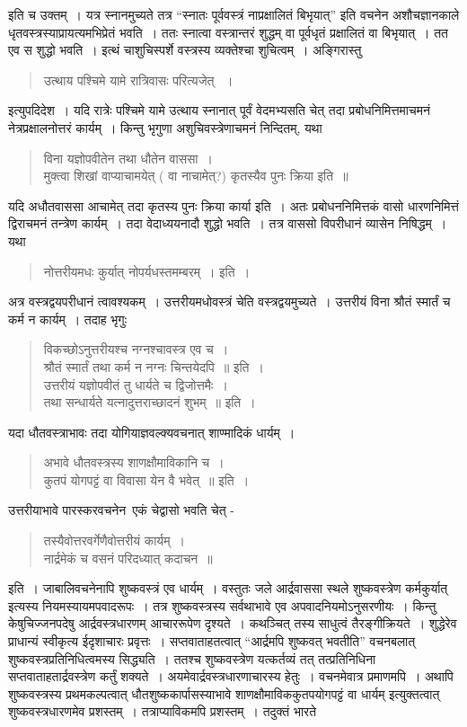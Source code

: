 {\begin{verse}
\end{verse}
इति च उक्तम्~। यत्र स्नानमुच्यते तत्र “स्नातः पूर्ववस्त्रं नाप्रक्षालितं बिभृयात्” इति वचनेन अशौचज्ञानकाले धृतवस्त्रस्याप्रायत्यमभिप्रेतं भवति~। ततः स्नात्वा वस्त्रान्तरं शुद्धम् वा पूर्वधृतं प्रक्षालितं वा बिभृयात्~। तत एव स शुद्धो भवति~। इत्थं चाशुचिस्पर्शे वस्त्रस्य व्यक्तेश्चा शुचित्वम्~। अङ्गिरास्तु  \enginline{-}
\begin{verse}
उत्थाय पश्चिमे यामे रात्रिवासः परित्यजेत् ~। 
\end{verse}
इत्युपदिदेश~। यदि रात्रेः पश्चिमे यामे उत्थाय स्नानात् पूर्वं वेदमभ्यसति चेत् तदा प्रबोधनिमित्तमाचमनं नेत्रप्रक्षालनोत्तरं कार्यम्~। किन्तु भृगुणा अशुचिवस्त्रेणाचमनं निन्दितम्, यथा \enginline{-}
\begin{verse}
विना यज्ञोपवीतेन तथा धौतेन वाससा~। \\
मुक्त्वा शिखां वाप्याचामयेत् ( वा नाचामेत्?) कृतस्यैव पुनः क्रिया इति~॥ 
\end{verse}
यदि अधौतवाससा आचामेत् तदा कृतस्य पुनः क्रिया कार्या इति~। अतः प्रबोधननिमित्तकं वासो धारणनिमित्तं द्विराचमनं तन्त्रेण कार्यम्~। तदा वेदाध्ययनादौ शुद्धो भवति~। तत्र वाससो विपरीधानं व्यासेन निषिद्धम्~। यथा \
\begin{verse}
नोत्तरीयमधः कुर्यात् नोपर्यधस्तमम्बरम्~। इति~। 
\end{verse}
अत्र वस्त्रद्वयपरीधानं त्वावश्यकम्~। उत्तरीयमधोवस्त्रं चेति वस्त्रद्वयमुच्यते~। उत्तरीयं विना श्रौतं स्मार्तं च कर्म न कार्यम्~। तदाह भृगुः \enginline{-} 
\begin{verse}
विकच्छोऽनुत्तरीयश्च नग्नश्चावस्त्र एव च~। \\
श्रौतं स्मार्तं तथा कर्म न नग्नः चिन्तयेदपि~॥ इति~। \\
उत्तरीयं यज्ञोपवीतं तु  धार्यते च द्विजोत्तमैः~। \\
तथा सन्धार्यते यत्नादुत्तराच्छादनं शुभम्~॥ इति~। 
\end{verse}
यदा धौतवस्त्राभावः तदा योगियाज्ञवल्क्यवचनात् शाण्मादिकं धार्यम्~। 
\begin{verse}
अभावे धौतवस्त्रस्य शाणक्षौमाविकानि च~। \\
कुतपं योगपट्टं वा विवासा येन वै भवेत्~॥ इति~। 
\end{verse}
उत्तरीयाभावे पारस्करवचनेन\ एकं चेद्वासो भवति चेत् -
\begin{verse}
तस्यैवोत्तरवर्गेणैवोत्तरीयं कार्यम्~। \\
नार्द्रमेकं च वसनं परिदध्यात् कदाचन~॥ 
\end{verse}
इति~। जाबालिवचनेनापि शुष्कवस्त्रं एव धार्यम्~। वस्तुतः जले आर्द्रवाससा स्थले शुष्कवस्त्रेण कर्मकुर्यात् इत्यस्य नियमस्यायमपवादरूपः~। तत्र शुष्कवस्त्रस्य सर्वथाभावे एव अपवादनियमोऽनुसरणीयः~। किन्तु केषुचिज्जनपदेषु आर्द्रवस्त्रधारणम् आचाररूपेण दृश्यते~। कथञ्चित् तस्य साधुत्वं तैरङ्गीक्रियते~। शुद्धेरेव प्राधान्यं स्वीकृत्य ईदृशाचारः प्रवृत्तः~। सप्तवाताहतत्वात् “आर्द्रमपि शुष्कवत् भवतीति” वचनबलात् शुष्कवस्त्रप्रतिनिधित्वमस्य सिद्ध्यति~। ततश्च शुष्कवस्त्रेण यत्कर्तव्यं तत् तत्प्रतिनिधिना सप्तवाताहतार्द्रवस्त्रेण कर्तुं शक्यते~। अयमेवार्द्रवस्त्रधारणाचारस्य हेतुः~। वचनमेवात्र प्रमाणमपि~। अथापि शुष्कवस्त्रस्य प्रथमकल्पत्वात् धौतशुष्ककार्पासस्याभावे शाणक्षौमाविककुतपयोगपट्टं वा धार्यम् इत्युक्तत्वात् शुष्कवस्त्रधारणमेव प्रशस्तम्~। तत्राप्याविकमपि प्रशस्तम्~। तदुक्तं भारते\enginline{-}
}
